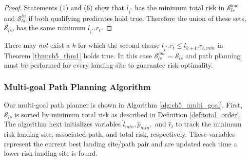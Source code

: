 \begin{proof}
Statements (1) and (6) show that $l_{i^{*}}$ has the minimum total risk in $\mathcal{S}_{ls}^{low}$ and $\mathcal{S}_{ls}^{hi}$ if both qualifying predicates hold true. Therefore the union of these sets, $\mathcal{S}_{ls}$, has the same minimum $l_{i^{*}}.r_t$. 

\end{proof}

\begin{remark}
There may \emph{not} exist a $k$ for which the second clause $l_{i^{*}}.r_{t} \le l_{k+1}.r_{t,min}$ in Theorem \ref{thm:ch5_thm1} holds true. In this case $\mathcal{S}_{ls}^{low} = \mathcal{S}_{ls}$ and path planning must be performed for every landing site to guarantee risk-optimality.
\end{remark}


\subsubsection{Multi-goal Path Planning Algorithm}\label{sec:ch5_alg_impl}

Our multi-goal path planner is shown in Algorithm \ref{alg:ch5_multi_goal}.  First, $\mathcal{S}_{ls}$ is sorted by minimum total risk as described in Definition \ref{def:total_order}.  The algorithm next initializes variables $\hat{l}_{min}, \hat{p}_{min},$ and $\hat{r}_{t}$ to track the minimum risk landing site, associated path, and total risk, respectively. These variables represent the current best landing site/path pair and are updated each time a lower risk landing site is found. 

